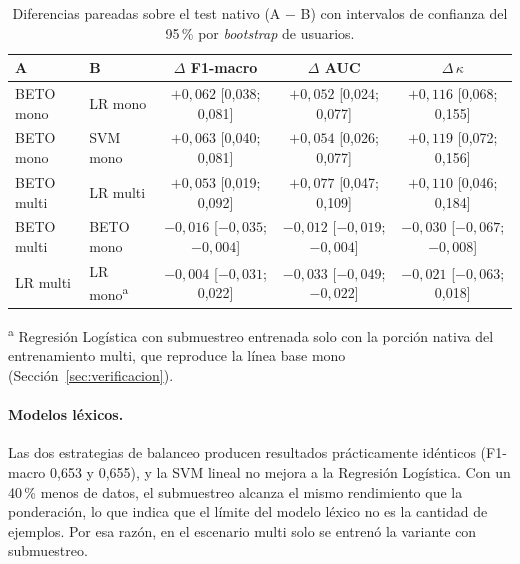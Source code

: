 \documentclass[12pt,a4paper]{article}
\begin{document}
\begin{table}[H]
\centering
\footnotesize
\setlength{\tabcolsep}{4pt}
\caption{Diferencias pareadas sobre el test nativo (A $-$ B) con intervalos de confianza del 95\,\% por \emph{bootstrap} de usuarios.}
\label{tab:diferencias}
\begin{tabular}{llccc}
\toprule
\textbf{A} & \textbf{B} & \textbf{$\Delta$ F1-macro} & \textbf{$\Delta$ AUC} & \textbf{$\Delta\,\kappa$} \\
\midrule
BETO mono  & LR mono    & $+0{,}062$ {\scriptsize [0{,}038; 0{,}081]} & $+0{,}052$ {\scriptsize [0{,}024; 0{,}077]} & $+0{,}116$ {\scriptsize [0{,}068; 0{,}155]} \\
BETO mono  & SVM mono   & $+0{,}063$ {\scriptsize [0{,}040; 0{,}081]} & $+0{,}054$ {\scriptsize [0{,}026; 0{,}077]} & $+0{,}119$ {\scriptsize [0{,}072; 0{,}156]} \\
BETO multi & LR multi   & $+0{,}053$ {\scriptsize [0{,}019; 0{,}092]} & $+0{,}077$ {\scriptsize [0{,}047; 0{,}109]} & $+0{,}110$ {\scriptsize [0{,}046; 0{,}184]} \\
\midrule
BETO multi & BETO mono  & $-0{,}016$ {\scriptsize [$-0{,}035$; $-0{,}004$]} & $-0{,}012$ {\scriptsize [$-0{,}019$; $-0{,}004$]} & $-0{,}030$ {\scriptsize [$-0{,}067$; $-0{,}008$]} \\
LR multi   & LR mono\textsuperscript{a} & $-0{,}004$ {\scriptsize [$-0{,}031$; 0{,}022]} & $-0{,}033$ {\scriptsize [$-0{,}049$; $-0{,}022$]} & $-0{,}021$ {\scriptsize [$-0{,}063$; 0{,}018]} \\
\bottomrule
\end{tabular}

\vspace{0.15cm}
{\footnotesize \textsuperscript{a} Regresión Logística con submuestreo entrenada solo con la porción nativa del entrenamiento multi, que reproduce la línea base mono (Sección~\ref{sec:verificacion}).}
\end{table}

\paragraph{Modelos léxicos.} Las dos estrategias de balanceo producen resultados prácticamente idénticos (F1-macro 0{,}653 y 0{,}655), y la SVM lineal no mejora a la Regresión Logística. Con un 40\,\% menos de datos, el submuestreo alcanza el mismo rendimiento que la ponderación, lo que indica que el límite del modelo léxico no es la cantidad de ejemplos. Por esa razón, en el escenario multi solo se entrenó la variante con submuestreo.
\end{document}
